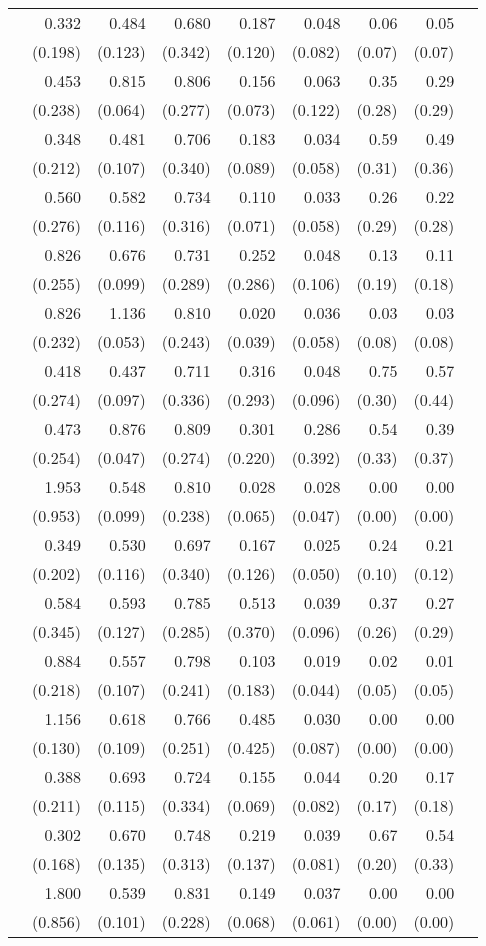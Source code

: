 \begin{longtable}{rrrrrrrrr}
\addlinespace[0.05cm] 32&0.332&0.484&0.680&0.187&0.048&0.06&0.05\\&(0.198)&(0.123)&(0.342)&(0.120)&(0.082)&(0.07)&(0.07) \\ \addlinespace[0.05cm] 33&0.453&0.815&0.806&0.156&0.063&0.35&0.29\\&(0.238)&(0.064)&(0.277)&(0.073)&(0.122)&(0.28)&(0.29) \\ \addlinespace[0.05cm] 34&0.348&0.481&0.706&0.183&0.034&0.59&0.49\\&(0.212)&(0.107)&(0.340)&(0.089)&(0.058)&(0.31)&(0.36) \\ \addlinespace[0.05cm] 35&0.560&0.582&0.734&0.110&0.033&0.26&0.22\\&(0.276)&(0.116)&(0.316)&(0.071)&(0.058)&(0.29)&(0.28) \\ \addlinespace[0.05cm] 36&0.826&0.676&0.731&0.252&0.048&0.13&0.11\\&(0.255)&(0.099)&(0.289)&(0.286)&(0.106)&(0.19)&(0.18) \\ \addlinespace[0.05cm] 37&0.826&1.136&0.810&0.020&0.036&0.03&0.03\\&(0.232)&(0.053)&(0.243)&(0.039)&(0.058)&(0.08)&(0.08) \\ \addlinespace[0.05cm] 38&0.418&0.437&0.711&0.316&0.048&0.75&0.57\\&(0.274)&(0.097)&(0.336)&(0.293)&(0.096)&(0.30)&(0.44) \\ \addlinespace[0.05cm] 39&0.473&0.876&0.809&0.301&0.286&0.54&0.39\\&(0.254)&(0.047)&(0.274)&(0.220)&(0.392)&(0.33)&(0.37) \\ \addlinespace[0.05cm] 40&1.953&0.548&0.810&0.028&0.028&0.00&0.00\\&(0.953)&(0.099)&(0.238)&(0.065)&(0.047)&(0.00)&(0.00) \\ \addlinespace[0.05cm] 41&0.349&0.530&0.697&0.167&0.025&0.24&0.21\\&(0.202)&(0.116)&(0.340)&(0.126)&(0.050)&(0.10)&(0.12) \\ \addlinespace[0.05cm] 42&0.584&0.593&0.785&0.513&0.039&0.37&0.27\\&(0.345)&(0.127)&(0.285)&(0.370)&(0.096)&(0.26)&(0.29) \\ \addlinespace[0.05cm] 43&0.884&0.557&0.798&0.103&0.019&0.02&0.01\\&(0.218)&(0.107)&(0.241)&(0.183)&(0.044)&(0.05)&(0.05) \\ \addlinespace[0.05cm] 44&1.156&0.618&0.766&0.485&0.030&0.00&0.00\\&(0.130)&(0.109)&(0.251)&(0.425)&(0.087)&(0.00)&(0.00) \\ \addlinespace[0.05cm] 45&0.388&0.693&0.724&0.155&0.044&0.20&0.17\\&(0.211)&(0.115)&(0.334)&(0.069)&(0.082)&(0.17)&(0.18) \\ \addlinespace[0.05cm] 46&0.302&0.670&0.748&0.219&0.039&0.67&0.54\\&(0.168)&(0.135)&(0.313)&(0.137)&(0.081)&(0.20)&(0.33) \\ \addlinespace[0.05cm] 47&1.800&0.539&0.831&0.149&0.037&0.00&0.00\\&(0.856)&(0.101)&(0.228)&(0.068)&(0.061)&(0.00)&(0.00) \\ 
\end{longtable}
